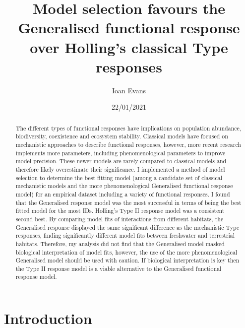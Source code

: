 \documentclass[11pt]{article}
\title{Model selection favours the Generalised functional response over Holling's classical Type responses} %
\author{Ioan Evans}
\affil{Department of Life Sciences, Imperial College London}
\date{22/01/2021}
\newcommand\wordcount{}
\begin{document}
    \maketitle
    \wordcount

\newpage
\linenumbers

    \begin{abstract}
        The different types of functional responses have implications on population abundance, biodiversity, coexistence and ecosystem stability. Classical models have focused on mechanistic approaches to describe functional responses, however, more recent research implements more parameters, including phenomenological parameters to improve model precision. These newer models are rarely compared to classical models and therefore likely overestimate their significance. I implemented a method of model selection to determine the best fitting model (among a candidate set of classical mechanistic models and the more phenomenological Generalised functional response model) for an empirical dataset including a variety of functional responses. I found that the Generalised response model was the most successful in terms of being the best fitted model for the most IDs. Holling's Type II response model was a consistent second best. By comparing model fits of interactions from different habitats, the Generalised response displayed the same significant difference as the mechanistic Type responses, finding significantly different model fits between freshwater and terrestrial habitats. Therefore, my analysis did not find that the Generalised model masked biological interpretation of model fits, however, the use of the more phenomenological Generalised model should be used with caution. If biological interpretation is key then the Type II response model is a viable alternative to the Generalised functional response model.
        
    \end{abstract}

    \section{Introduction}
\end{document}
